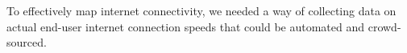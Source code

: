 To effectively map internet connectivity, we needed a way of collecting data on actual end-user internet connection speeds that could be automated and crowd-sourced.